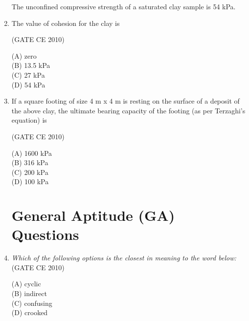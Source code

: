 \documentclass[journal,12pt,onecolumn]{exam}
\theoremstyle{remark}
\begin{document}
\begin{enumerate}
\setlength{\parskip}{0.5cm}


The unconfined compressive strength of a saturated clay sample is 54 kPa.

\setlength{\parskip}{0.5cm}

\noindent\item The value of cohesion for the clay is

\setlength{\parskip}{0.5cm}

\hfill{(GATE CE 2010)}

\begin{multicols}{4}
\noindent(A) zero\\
(B) 13.5 kPa\\
(C) 27 kPa\\
(D) 54 kPa
\end{multicols}

\setlength{\parskip}{0.5cm}
\noindent\item If a square footing of size 4 m x 4 m is resting on the surface of a deposit of the above clay, the ultimate bearing capacity of the footing (as per Terzaghi’s equation) is

\setlength{\parskip}{0.5cm}

\hfill{(GATE CE 2010)}

\begin{multicols}{4}
\noindent(A) 1600 kPa\\
(B) 316 kPa\\
(C) 200 kPa\\
(D) 100 kPa
\end{multicols}


\section*{General Aptitude (GA) Questions}


\setlength{\parskip}{0.5cm}
\noindent \item \textit{Which of the following options is the closest in meaning to the word below:}\\


\hfill{(GATE CE 2010)}

\begin{multicols}{4}
\noindent(A) cyclic\\
(B) indirect\\
(C) confusing\\
(D) crooked
\end{multicols}


\end{enumerate}
\end{document}
